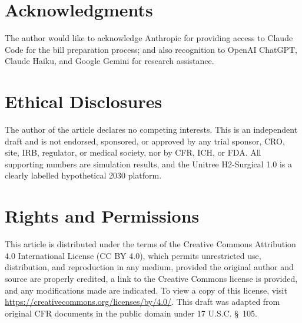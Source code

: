 



\vspace{-0.1cm}

\section*{Acknowledgments}
\label{sec:acknowledgments}
\vspace{-0.15cm}
The author would like to acknowledge Anthropic for providing access to Claude
Code for the bill preparation process; and also recognition to OpenAI ChatGPT, Claude Haiku, and Google Gemini for research assistance.
 
 
\vspace{-0.1cm}
\section*{Ethical Disclosures}
\label{sec:ethics}
\vspace{-0.15cm}
The author of the article declares no competing interests. This is an independent
draft and is not endorsed, sponsored, or approved by any trial sponsor, CRO, site,
IRB, regulator, or medical society, nor by CFR, ICH, or FDA. All supporting
numbers are simulation results, and the Unitree H2-Surgical 1.0 is a clearly
labelled hypothetical 2030 platform.
\vspace{-0.1cm}
{}
\section*{Rights and Permissions}
\label{sec:rights}
\vspace{-0.15cm}
This article is distributed under the terms of the Creative Commons Attribution
4.0 International License (CC BY 4.0), which permits unrestricted use,
distribution, and reproduction in any medium, provided the original author and
source are properly credited, a link to the Creative Commons license is provided,
and any modifications made are indicated. To view a copy of this license, visit
\url{https://creativecommons.org/licenses/by/4.0/}. This draft was adapted from
original CFR documents in the public domain under 17 U.S.C. \S~105.
\vspace{-0.1cm}
{}
